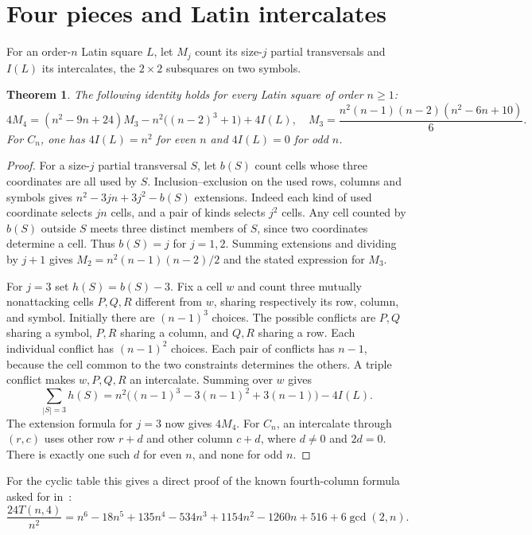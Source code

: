 \documentclass[11pt]{article}
\newtheorem{theorem}{Theorem}
\begin{document}
\section{Four pieces and Latin intercalates}
For an order-$n$ Latin square $L$, let $M_j$ count its size-$j$ partial transversals and $I(L)$ its intercalates, the $2\times2$ subsquares on two symbols.
\begin{theorem}\label{thm:four}
The following identity holds for every Latin square of order $n\ge1$:
\[
4M_4=(n^2-9n+24)M_3-n^2\big((n-2)^3+1\big)+4I(L),\quad
M_3=\frac{n^2(n-1)(n-2)(n^2-6n+10)}6.
\]
For $C_n$, one has $4I(L)=n^2$ for even $n$ and $4I(L)=0$ for odd $n$.
\end{theorem}
\begin{proof}
For a size-$j$ partial transversal $S$, let $b(S)$ count cells whose three coordinates are all used by $S$. Inclusion--exclusion on the used rows, columns and symbols gives $n^2-3jn+3j^2-b(S)$ extensions. Indeed each kind of used coordinate selects $jn$ cells, and a pair of kinds selects $j^2$ cells. Any cell counted by $b(S)$ outside $S$ meets three distinct members of $S$, since two coordinates determine a cell. Thus $b(S)=j$ for $j=1,2$. Summing extensions and dividing by $j+1$ gives $M_2=n^2(n-1)(n-2)/2$ and the stated expression for $M_3$.

For $j=3$ set $h(S)=b(S)-3$. Fix a cell $w$ and count three mutually nonattacking cells $P,Q,R$ different from $w$, sharing respectively its row, column, and symbol. Initially there are $(n-1)^3$ choices. The possible conflicts are $P,Q$ sharing a symbol, $P,R$ sharing a column, and $Q,R$ sharing a row. Each individual conflict has $(n-1)^2$ choices. Each pair of conflicts has $n-1$, because the cell common to the two constraints determines the others. A triple conflict makes $w,P,Q,R$ an intercalate. Summing over $w$ gives
\[
\sum_{|S|=3}h(S)=n^2\big((n-1)^3-3(n-1)^2+3(n-1)\big)-4I(L).
\]
The extension formula for $j=3$ now gives $4M_4$. For $C_n$, an intercalate through $(r,c)$ uses other row $r+d$ and other column $c+d$, where $d\ne0$ and $2d=0$. There is exactly one such $d$ for even $n$, and none for odd $n$.
\end{proof}
For the cyclic table this gives a direct proof of the known fourth-column formula~\cite{partial} asked for in~\cite[p.~1]{trump}:
\[
\frac{24T(n,4)}{n^2}=n^6-18n^5+135n^4-534n^3+1154n^2-1260n+516+6\gcd(2,n).
\]
\end{document}
